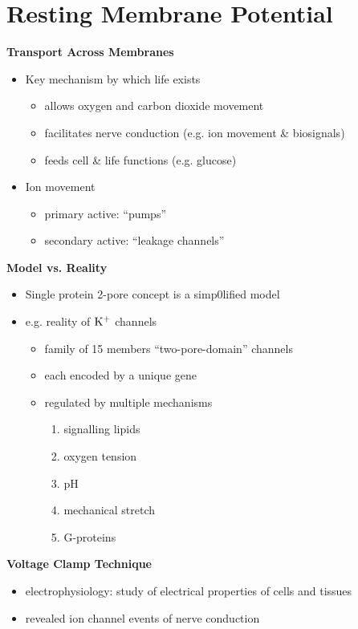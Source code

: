 \documentclass[11pt,fleqn]{book}
\begin{document}
\section{Resting Membrane Potential}
\textbf{Transport Across Membranes}
\begin{itemize}
    \item Key mechanism by which life exists
    \begin{itemize}
        \item allows oxygen and carbon dioxide movement
        \item facilitates nerve conduction (e.g. ion movement \& biosignals)
        \item feeds cell \& life functions (e.g. glucose)
    \end{itemize}
    \item Ion movement
    \begin{itemize}
        \item primary active: \enquote{pumps}
        \item secondary active: \enquote{leakage channels}
    \end{itemize}
\end{itemize}
\textbf{Model vs. Reality}
\begin{itemize}
    \item Single protein 2-pore concept is a simp0lified model
    \item e.g. reality of ${\rm K^+}$ channels
    \begin{itemize}
        \item family of 15 members \enquote{two-pore-domain} channels
        \item each encoded by a unique gene
        \item regulated by multiple mechanisms
        \begin{enumerate}
            \item signalling lipids
            \item oxygen tension
            \item pH
            \item mechanical stretch
            \item G-proteins
        \end{enumerate}
    \end{itemize}
\end{itemize}
\textbf{Voltage Clamp Technique}
\begin{itemize}
    \item electrophysiology: study of electrical properties of cells and tissues
    \item revealed ion channel events of nerve conduction
\end{itemize}
\end{document}
